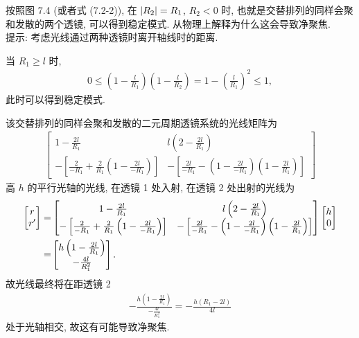 \documentclass[twoside]{note}
\begin{document}
\begin{exe}
    按照图 7.4 (或者式 (7.2-2)), 在 $\left\lvert R_2\right\rvert=R_1$, $R_2<0$ 时, 也就是交替排列的同样会聚和发散的两个透镜, 可以得到稳定模式. 从物理上解释为什么这会导致净聚焦.\\
    提示: 考虑光线通过两种透镜时离开轴线时的距离.
\end{exe}
\begin{sol}
    当 $R_1\geq l$ 时,
    \begin{align}
        0\leq\left(1-\frac{l}{R_1}\right)\left(1-\frac{l}{R_2}\right)=1-\left(\frac{l}{R_1}\right)^2\leq 1,
    \end{align}
    此时可以得到稳定模式.

    该交替排列的同样会聚和发散的二元周期透镜系统的光线矩阵为
    \begin{align}
        \begin{bmatrix}
            1-\frac{2l}{R_1}&l\left(2-\frac{2l}{R_1}\right)\\
            -\left[\frac{2}{-R_1}+\frac{2}{R_1}\left(1-\frac{2l}{-R_1}\right)\right]&-\left[\frac{2l}{-R_1}-\left(1-\frac{2l}{-R_1}\right)\left(1-\frac{2l}{R_1}\right)\right]
        \end{bmatrix}
    \end{align}
    高 $h$ 的平行光轴的光线, 在透镜 1 处入射, 在透镜 2 处出射的光线为
    \begin{align}
        \notag\begin{bmatrix}
            r\\
            r'
        \end{bmatrix}=&\begin{bmatrix}
            1-\frac{2l}{R_1}&l\left(2-\frac{2l}{R_1}\right)\\
            -\left[\frac{2}{-R_1}+\frac{2}{R_1}\left(1-\frac{2l}{-R_1}\right)\right]&-\left[\frac{2l}{-R_1}-\left(1-\frac{2l}{-R_1}\right)\left(1-\frac{2l}{R_1}\right)\right]
        \end{bmatrix}\begin{bmatrix}
            h\\
            0
        \end{bmatrix}\\
        =&\begin{bmatrix}
            h\left(1-\frac{2l}{R_1}\right)\\
            -\frac{4l}{R_1^2}
        \end{bmatrix}.
    \end{align}
    故光线最终将在距透镜 2
    \begin{align}
        -\frac{h\left(1-\frac{2l}{R_1}\right)}{-\frac{4l}{R_1^2}}=-\frac{h(R_1-2l)}{4l}
    \end{align}
    处于光轴相交, 故这有可能导致净聚焦.
\end{sol}
\end{document}
